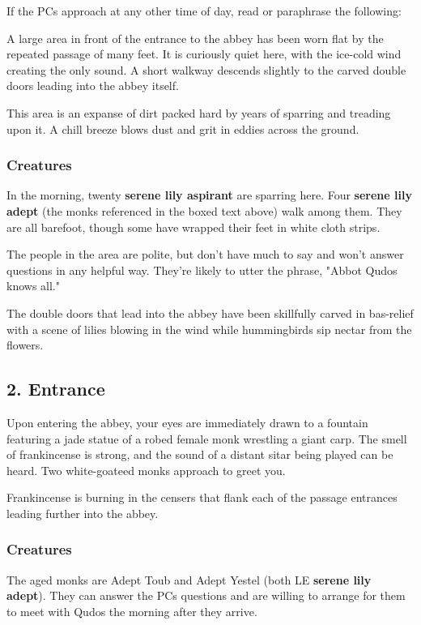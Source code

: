 \documentclass[10pt,a4paper,twoside,bg=print,twocolumn,openany,nodeprecatedcode]{dndbook}
\begin{document}
If the PCs approach at any other time of day, read or paraphrase the following:

\begin{DndReadAloud}{}
A large area in front of the entrance to the abbey has been worn flat by the repeated passage of many feet. It is curiously quiet here, with the ice-cold wind creating the only sound. A short walkway descends slightly to the carved double doors leading into the abbey itself.

\end{DndReadAloud}

This area is an expanse of dirt packed hard by years of sparring and treading upon it. A chill breeze blows dust and grit in eddies across the ground.

\subsubsection{Creatures}
In the morning, twenty \textbf{serene lily aspirant} are sparring here. Four \textbf{serene lily adept} (the monks referenced in the boxed text above) walk among them. They are all barefoot, though some have wrapped their feet in white cloth strips.

The people in the area are polite, but don't have much to say and won't answer questions in any helpful way. They're likely to utter the phrase, "Abbot Qudos knows all."

The double doors that lead into the abbey have been skillfully carved in bas-relief with a scene of lilies blowing in the wind while hummingbirds sip nectar from the flowers.

\subsection{2. Entrance}
\begin{DndReadAloud}{}
Upon entering the abbey, your eyes are immediately drawn to a fountain featuring a jade statue of a robed female monk wrestling a giant carp. The smell of frankincense is strong, and the sound of a distant sitar being played can be heard. Two white-goateed monks approach to greet you.

\end{DndReadAloud}

Frankincense is burning in the censers that flank each of the passage entrances leading further into the abbey.

\subsubsection{Creatures}
The aged monks are Adept Toub and Adept Yestel (both LE \textbf{serene lily adept}). They can answer the PCs questions and are willing to arrange for them to meet with Qudos the morning after they arrive.
\end{document}
